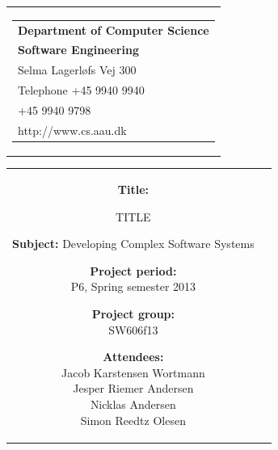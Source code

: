 \thispagestyle{empty}
\begin{titlepage}
\begin{nopagebreak}
\setcounter{page}{3}
{\samepage 
\begin{tabular}{r}
\parbox{\textwidth}{  
\hfill \parbox{4.9cm}{\begin{tabular}{l}
{\sf\small \textbf{Department of Computer Science }}\\
{\sf\small  \textbf{Software Engineering}} \\
{\sf\small Selma Lagerløfs Vej 300} \\
{\sf\small Telephone +45 9940 9940} \\
{\sf\small +45 9940 9798} \\
{\sf\small http://www.cs.aau.dk}
\end{tabular}}}
\\
\end{tabular}

\begin{tabular}{cc}
\parbox{6cm}{
\begin{description}

\item {\bf Title:} 

TITLE
  
\item {\bf Subject:} 
Developing Complex Software Systems

\end{description}

\parbox{8cm}{

\begin{description}
\item {\bf Project period:}\\
   P6, Spring semester 2013\\
  \hspace{4cm}
\item {\bf Project group:}\\
  SW606f13\\
  \hspace{4cm}
\item {\bf Attendees:}\\
Jacob Karstensen Wortmann \\
Jesper Riemer Andersen \\
Nicklas Andersen \\
Simon Reedtz Olesen \\


\end{description}}}
\end{tabular}}
\end{nopagebreak}
\end{titlepage}
